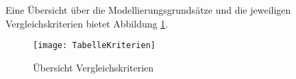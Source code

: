 Eine Übersicht über die Modellierungsgrundsätze und die jeweiligen Vergleichskriterien bietet Abbildung \ref{fig:TabelleKriterien}.

\begin{figure}[!htbp]
\begin{center}
  \texttt{[image: TabelleKriterien]} %
  \caption{Übersicht Vergleichskriterien}
  \label{fig:TabelleKriterien}
\end{center}
\end{figure}








